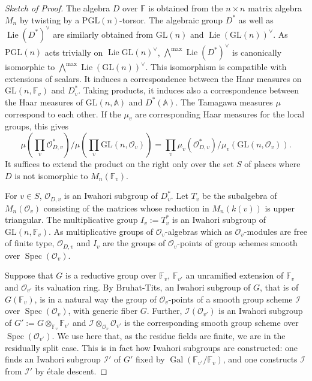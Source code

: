 \documentclass[11pt,a4paper]{article}
\theoremstyle{plain}
\theoremstyle{definition}
\DeclareMathOperator{\Spec}{Spec}
\DeclareMathOperator{\Gal}{Gal}
\DeclareMathOperator{\Lie}{Lie}
\newcommand{\GL}{\mathrm{GL}}
\newcommand{\PGL}{\mathrm{PGL}}
\begin{document}
\begin{proof}[Sketch of Proof]
The algebra $D$ over $\mathbb{F}$ is obtained from the $n \times n$ matrix algebra $M_n$ by twisting by a $\PGL(n)$-torsor. The algebraic group $D^*$ as well as $\Lie(D^*)^\vee$ are similarly obtained from $\GL(n)$ and $\Lie(\GL(n))^\vee$. As $\PGL(n)$ acts trivially on $\Lie\GL(n)^\vee$, $\bigwedge^{\max} \Lie(D^*)^\vee$ is canonically isomorphic to $\bigwedge^{\max} \Lie(\GL(n))^\vee$. This isomorphism is compatible with extensions of scalars. It induces a correspondence between the Haar measures on $\GL(n, \mathbb{F}_v)$ and $D_v^*$. Taking products, it induces also a correspondence between the Haar measures of $\GL(n, \mathbb{A})$ and $D^*(\mathbb{A})$. The Tamagawa measures $\mu$ correspond to each other. If the $\mu_v$ are corresponding Haar measures for the local groups, this gives
\begin{equation}
\mu\left(\prod_v \mathcal{O}_{D,v}^*\right) / \mu\left(\prod_v \GL(n, \mathcal{O}_v)\right) = \prod_v \mu_v(\mathcal{O}_{D,v}^*)/\mu_v(\GL(n, \mathcal{O}_v)). \tag{3.11.4}
\end{equation}
It suffices to extend the product on the right only over the set $S$ of places where $D$ is not isomorphic to $M_n(\mathbb{F}_v)$.

For $v \in S$, $\mathcal{O}_{D,v}$ is an Iwahori subgroup of $D_v^*$. Let $T_v$ be the subalgebra of $M_n(\mathcal{O}_v)$ consisting of the matrices whose reduction in $M_n(k(v))$ is upper triangular. The multiplicative group $I_v := T_v^*$ is an Iwahori subgroup of $\GL(n, \mathbb{F}_v)$. As multiplicative groups of $\mathcal{O}_v$-algebras which as $\mathcal{O}_v$-modules are free of finite type, $\mathcal{O}_{D,v}$ and $I_v$ are the groups of $\mathcal{O}_v$-points of group schemes smooth over $\Spec(\mathcal{O}_v)$.

Suppose that $G$ is a reductive group over $\mathbb{F}_v$, $\mathbb{F}_{v'}$ an unramified extension of $\mathbb{F}_v$ and $\mathcal{O}_{v'}$ its valuation ring. By Bruhat-Tits, an Iwahori subgroup of $G$, that is of $G(\mathbb{F}_v)$, is in a natural way the group of $\mathcal{O}_v$-points of a smooth group scheme $\mathcal{I}$ over $\Spec(\mathcal{O}_v)$, with generic fiber $G$. Further, $\mathcal{I}(\mathcal{O}_{v'})$ is an Iwahori subgroup of $G' := G \otimes_{\mathbb{F}_v} \mathbb{F}_{v'}$ and $\mathcal{I} \otimes_{\mathcal{O}_v} \mathcal{O}_{v'}$ is the corresponding smooth group scheme over $\Spec(\mathcal{O}_{v'})$. We use here that, as the residue fields are finite, we are in the residually split case. This is in fact how Iwahori subgroups are constructed: one finds an Iwahori subgroup $\mathcal{I}'$ of $G'$ fixed by $\Gal(\mathbb{F}_{v'}/\mathbb{F}_v)$, and one constructs $\mathcal{I}$ from $\mathcal{I}'$ by \'etale descent.


\end{proof}
\end{document}
